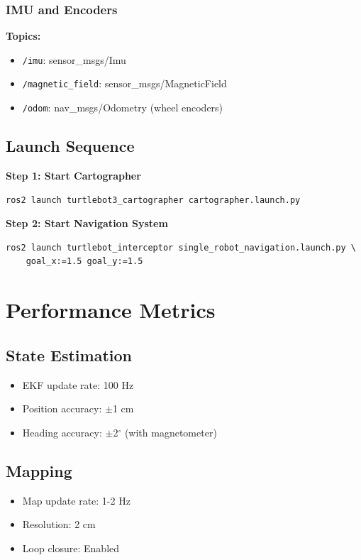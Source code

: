 \documentclass[11pt]{article}
\begin{document}
\subsubsection{IMU and Encoders}

\textbf{Topics:}
\begin{itemize}
    \item \texttt{/imu}: sensor\_msgs/Imu
    \item \texttt{/magnetic\_field}: sensor\_msgs/MagneticField
    \item \texttt{/odom}: nav\_msgs/Odometry (wheel encoders)
\end{itemize}

\subsection{Launch Sequence}

\textbf{Step 1: Start Cartographer}
\begin{lstlisting}[style=bash]
ros2 launch turtlebot3_cartographer cartographer.launch.py
\end{lstlisting}

\textbf{Step 2: Start Navigation System}
\begin{lstlisting}[style=bash]
ros2 launch turtlebot_interceptor single_robot_navigation.launch.py \
    goal_x:=1.5 goal_y:=1.5
\end{lstlisting}

\section{Performance Metrics}

\subsection{State Estimation}
\begin{itemize}
    \item EKF update rate: 100 Hz
    \item Position accuracy: $\pm$1 cm
    \item Heading accuracy: $\pm$2$^\circ$ (with magnetometer)
\end{itemize}

\subsection{Mapping}
\begin{itemize}
    \item Map update rate: 1-2 Hz
    \item Resolution: 2 cm
    \item Loop closure: Enabled
\end{itemize}
\end{document}
